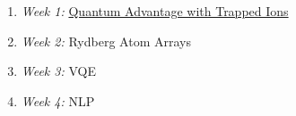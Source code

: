 \documentclass[12pt]{article}
\begin{document}
\begin{enumerate}
\item {\it Week 1:} \href{https://github.com/CDL-Quantum/CohortProject_2021/tree/main/Week1_Trapped_Ions}{Quantum Advantage with Trapped Ions}
\item {\it Week 2:} Rydberg Atom Arrays
\item {\it Week 3:} VQE
\item {\it Week 4:} NLP

\end{enumerate}


\newpage



\end{document}

